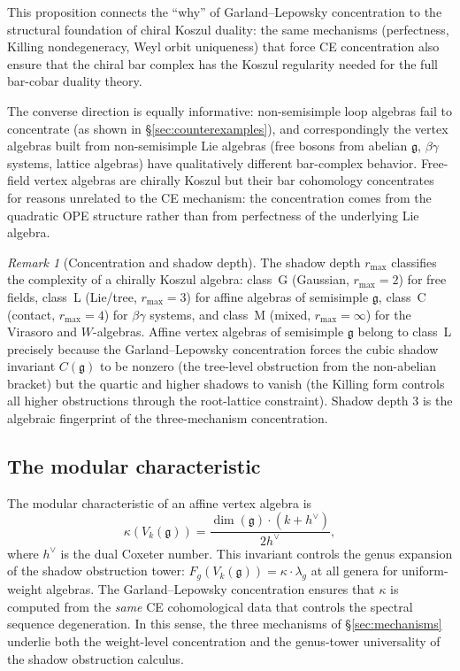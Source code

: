 \documentclass[11pt,reqno]{amsart}
\theoremstyle{plain}
\theoremstyle{definition}
\theoremstyle{remark}
\newtheorem{remark}[theorem]{Remark}
\newcommand{\fg}{\mathfrak{g}}
\begin{document}
This proposition connects the ``why'' of Garland--Lepowsky concentration to
the structural foundation of chiral Koszul duality: the same mechanisms
(perfectness, Killing nondegeneracy, Weyl orbit uniqueness) that force CE
concentration also ensure that the chiral bar complex has the Koszul
regularity needed for the full bar-cobar duality theory.

The converse direction is equally informative: non-semisimple loop algebras
fail to concentrate (as shown in \S\ref{sec:counterexamples}), and
correspondingly the vertex algebras built from non-semisimple Lie algebras
(free bosons from abelian $\fg$, $\beta\gamma$ systems, lattice algebras)
have qualitatively different bar-complex behavior. Free-field vertex
algebras are chirally Koszul but their bar cohomology concentrates for
reasons unrelated to the CE mechanism: the concentration comes from the
quadratic OPE structure rather than from perfectness of the underlying
Lie algebra.

\begin{remark}[Concentration and shadow depth]\label{rem:shadow-depth}
 The shadow depth $r_{\max}$ classifies the complexity of a chirally
 Koszul algebra: class~G (Gaussian, $r_{\max} = 2$) for free fields,
 class~L (Lie/tree, $r_{\max} = 3$) for affine algebras of semisimple
 $\fg$, class~C (contact, $r_{\max} = 4$) for $\beta\gamma$ systems,
 and class~M (mixed, $r_{\max} = \infty$) for the Virasoro and
 $W$-algebras. Affine vertex algebras of semisimple $\fg$ belong to
 class~L precisely because the Garland--Lepowsky concentration forces
 the cubic shadow invariant $C(\fg)$ to be nonzero (the tree-level
 obstruction from the non-abelian bracket) but the quartic and higher
 shadows to vanish (the Killing form controls all higher obstructions
 through the root-lattice constraint). Shadow depth $3$ is the
 algebraic fingerprint of the three-mechanism concentration.
\end{remark}


\subsection{The modular characteristic}

The modular characteristic of an affine vertex algebra is
\[
 \kappa(V_k(\fg)) = \frac{\dim(\fg) \cdot (k + h^\vee)}{2h^\vee},
\]
where $h^\vee$ is the dual Coxeter number. This invariant controls the
genus expansion of the shadow obstruction tower: $F_g(V_k(\fg)) = \kappa
\cdot \lambda_g$ at all genera for uniform-weight algebras. The
Garland--Lepowsky concentration ensures that $\kappa$ is computed from the
\emph{same} CE cohomological data that controls the spectral sequence
degeneration. In this sense, the three mechanisms of
\S\ref{sec:mechanisms} underlie both the weight-level concentration and the
genus-tower universality of the shadow obstruction calculus.
\end{document}
